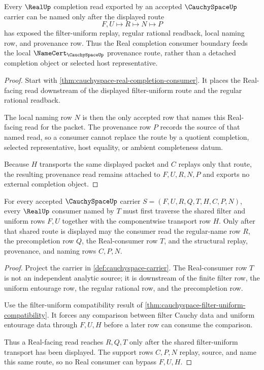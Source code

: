 \begin{theorem}
\label{thm:cauchyspace-real-completion-provenance-route}
Every $\RealUp$ completion read exported by an accepted $\CauchySpaceUp$ carrier can be named only after the displayed route
$$
F,U \longmapsto R \longmapsto N \longmapsto P
$$
has exposed the filter-uniform replay, regular rational readback, local naming row, and provenance row. Thus the Real completion consumer boundary feeds the local $\NameCert_{\CauchySpaceUp}$ provenance route, rather than a detached completion object or selected host representative.
\end{theorem}
\begin{proof}
Start with \autoref{thm:cauchyspace-real-completion-consumer}. It places the Real-facing read downstream of the displayed filter-uniform route and the regular rational readback.

The local naming row $N$ is then the only accepted row that names this Real-facing read for the packet. The provenance row $P$ records the source of that named read, so a consumer cannot replace the route by a quotient completion, selected representative, host equality, or ambient completeness datum.

Because $H$ transports the same displayed packet and $C$ replays only that route, the resulting provenance read remains attached to $F,U,R,N,P$ and exports no external completion object.
\end{proof}

\begin{theorem}
\label{thm:cauchyspace-filter-uniform-real-consumer-obligation}
For every accepted $\CauchySpaceUp$ carrier $S=(F,U,R,Q,T,H,C,P,N)$, every $\RealUp$ consumer named by $T$ must first traverse the shared filter and uniform rows $F,U$ together with the componentwise transport row $H$. Only after that shared route is displayed may the consumer read the regular-name row $R$, the precompletion row $Q$, the Real-consumer row $T$, and the structural replay, provenance, and naming rows $C,P,N$.
\end{theorem}
\begin{proof}
Project the carrier in \autoref{def:cauchyspace-carrier}. The Real-consumer row $T$ is not an independent analytic source; it is downstream of the finite filter row, the uniform entourage row, the regular rational row, and the precompletion row.

Use the filter-uniform compatibility result of \autoref{thm:cauchyspace-filter-uniform-compatibility}. It forces any comparison between filter Cauchy data and uniform entourage data through $F,U,H$ before a later row can consume the comparison.

Thus a Real-facing read reaches $R,Q,T$ only after the shared filter-uniform transport has been displayed. The support rows $C,P,N$ replay, source, and name this same route, so no Real consumer can bypass $F,U,H$.
\end{proof}


